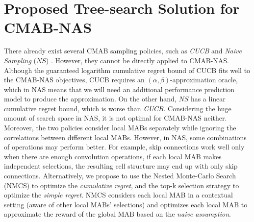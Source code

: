\documentclass[conference]{IEEEtran}
\begin{document}
\section{Proposed Tree-search Solution for CMAB-NAS} \label{sec:problem_solution}
There already exist several CMAB sampling policies, such as \emph{CUCB} \cite{chen2013combinatorial} and \emph{Naive Sampling} ($NS$) \cite{ontanon2013combinatorial}. However, they cannot be directly applied to CMAB-NAS.
Although the guaranteed logarithm cumulative regret bound of CUCB fits well to the CMAB-NAS objectives, CUCB requires an $(\alpha , \beta)$-approximation oracle, which in NAS means that we will need an additional performance prediction model to produce the approximation.
On the other hand, $NS$ has a linear cumulative regret bound, which is worse than $\emph{CUCB}$. Considering the huge amount of search space in NAS, it is not optimal for CMAB-NAS neither. 
Moreover, the two policies consider local MABs separately while ignoring the correlations between different local MABs. 
However, in NAS, some combinations of operations may perform better. For example, skip connections work well only when there are enough convolution operations, if each local MAB makes independent selections, the resulting cell structure may end up with only skip connections.
Alternatively, we propose to use the Nested Monte-Carlo Search (NMCS) \cite{cazenave2009nested} to optimize the \emph{cumulative regret}, and the top-k selection strategy to optimize the \emph{simple regret}. NMCS considers each local MAB in a contextual setting (aware of other local MABs' selections) and optimizes each local MAB to approximate the reward of the global MAB based on the \emph{naive assumption}.
\end{document}
